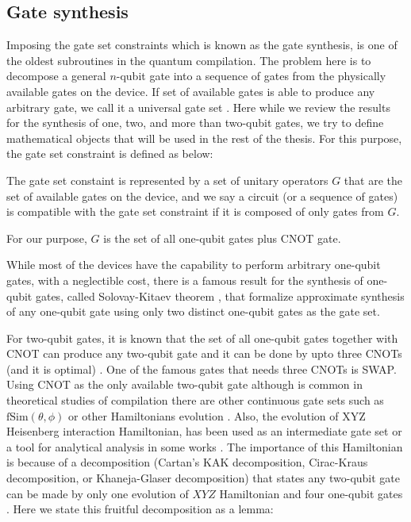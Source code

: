 \subsection{Gate synthesis}

Imposing the gate set constraints which is known as the gate synthesis, is one of the oldest subroutines in the quantum compilation. The problem here is to decompose a general $n$-qubit gate into a sequence of gates from the physically available gates on the device. If set of available gates is able to produce any arbitrary gate, we call it a universal gate set \cite{barenco1995}. Here while we review the results for the synthesis of one, two, and more than two-qubit gates, we try to define mathematical objects that will be used in the rest of the thesis. For this purpose, the gate set constraint is defined as below:

\begin{definition}
  The gate set constaint is represented by a set of unitary operators $G$ that are the set of available gates on the device, and we say a circuit (or a sequence of gates) is compatible with the gate set constraint if it is composed of only gates from $G$.

  For our purpose, $G$ is the set of all one-qubit gates plus CNOT gate.
\end{definition}

While most of the devices have the capability to perform arbitrary one-qubit gates, with a neglectible cost, there is a famous result for the synthesis of one-qubit gates, called Solovay-Kitaev theorem \cite{dawson2006}, that formalize approximate synthesis of any one-qubit gate using only two distinct one-qubit gates as the gate set.

For two-qubit gates, it is known that the set of all one-qubit gates together with CNOT can produce any two-qubit gate and it can be done by upto three CNOTs (and it is optimal) \cite{vatan2004,vidal2004}. One of the famous gates that needs three CNOTs is SWAP. Using CNOT as the only available two-qubit gate although is common in theoretical studies of compilation \cite{zulehner2018,siraichi2018,li2019,zhang2021,itoko2019,murali2019} there are other continuous gate sets such as $\mathrm{fSim}(\theta, \phi)$ \cite{foxen2020} or other Hamiltonians evolution \cite{childsa}. Also, the evolution of XYZ Heisenberg interaction Hamiltonian, has been used as an intermediate gate set or a tool for analytical analysis in some works \cite{sousa2006,vidal2004}. The importance of this Hamiltonian is because of a decomposition (Cartan's KAK decomposition, Cirac-Kraus decomposition, or Khaneja-Glaser decomposition) that states any two-qubit gate can be made by only one evolution of $XYZ$ Hamiltonian and four one-qubit gates \cite{kraus2001,khaneja2001}. Here we state this fruitful decomposition as a lemma:

